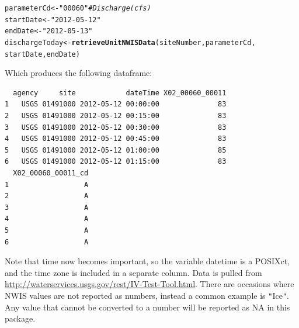 \documentclass[a4paper,11pt]{article}\usepackage[]{graphicx}\usepackage[]{color}
\makeatletter
\newcommand{\hlstr}[1]{\textcolor[rgb]{0.192,0.494,0.8}{#1}}%
\newcommand{\hlcom}[1]{\textcolor[rgb]{0.678,0.584,0.686}{\textit{#1}}}%
\newcommand{\hlstd}[1]{\textcolor[rgb]{0.345,0.345,0.345}{#1}}%
\newcommand{\hlkwb}[1]{\textcolor[rgb]{0.69,0.353,0.396}{#1}}%
\newcommand{\hlkwd}[1]{\textcolor[rgb]{0.737,0.353,0.396}{\textbf{#1}}}%
\newenvironment{kframe}{%
 \def\at@end@of@kframe{}%
 \ifinner\ifhmode%
  \def\at@end@of@kframe{\end{minipage}}%
  \begin{minipage}{\columnwidth}%
 \fi\fi%
 \def\FrameCommand##1{\hskip\@totalleftmargin \hskip-\fboxsep
 \colorbox{shadecolor}{##1}\hskip-\fboxsep
     \hskip-\linewidth \hskip-\@totalleftmargin \hskip\columnwidth}%
 \MakeFramed {\advance\hsize-\width
   \@totalleftmargin\z@ \linewidth\hsize
   \@setminipage}}%
 {\par\unskip\endMakeFramed%
 \at@end@of@kframe}
\newenvironment{knitrout}{}{} %
\makeatother
\begin{document}
\begin{knitrout}
\color{fgcolor}\begin{kframe}
\begin{alltt}
\hlstd{parameterCd} \hlkwb{<-} \hlstr{"00060"}  \hlcom{# Discharge (cfs)}
\hlstd{startDate} \hlkwb{<-} \hlstr{"2012-05-12"}
\hlstd{endDate} \hlkwb{<-} \hlstr{"2012-05-13"}
\hlstd{dischargeToday} \hlkwb{<-} \hlkwd{retrieveUnitNWISData}\hlstd{(siteNumber, parameterCd,}
        \hlstd{startDate, endDate)}
\end{alltt}
\end{kframe}
\end{knitrout}

Which produces the following dataframe:
\begin{knitrout}
\color{fgcolor}\begin{kframe}
\begin{verbatim}
  agency     site            dateTime X02_00060_00011
1   USGS 01491000 2012-05-12 00:00:00              83
2   USGS 01491000 2012-05-12 00:15:00              83
3   USGS 01491000 2012-05-12 00:30:00              83
4   USGS 01491000 2012-05-12 00:45:00              83
5   USGS 01491000 2012-05-12 01:00:00              85
6   USGS 01491000 2012-05-12 01:15:00              83
  X02_00060_00011_cd
1                  A
2                  A
3                  A
4                  A
5                  A
6                  A
\end{verbatim}
\end{kframe}
\end{knitrout}


Note that time now becomes important, so the variable datetime is a POSIXct, and the time zone is included in a separate column. Data is pulled from \url{http://waterservices.usgs.gov/rest/IV-Test-Tool.html}. There are occasions where NWIS values are not reported as numbers, instead a common example is \texttt{"}Ice\texttt{"}.  Any value that cannot be converted to a number will be reported as NA in this package.

\newpage


\FloatBarrier

\end{document}
